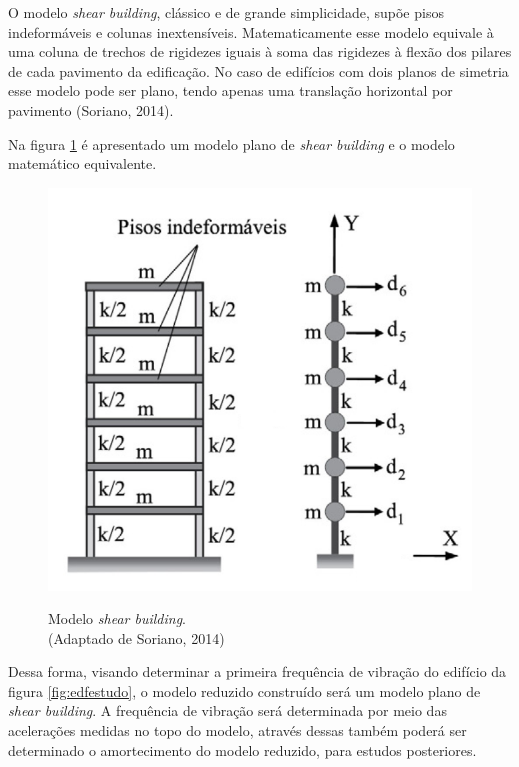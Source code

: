 O modelo \textit{shear building}, clássico e de grande simplicidade, supõe pisos indeformáveis e colunas inextensíveis. Matematicamente esse modelo equivale à uma coluna de trechos de rigidezes iguais à soma das rigidezes à flexão dos pilares de cada pavimento da edificação. No caso de edifícios com dois planos de simetria esse modelo pode ser plano, tendo apenas uma translação horizontal por pavimento (Soriano, 2014). 

Na figura \ref{fig:shearb} é apresentado um modelo plano de \textit{shear building} e o modelo matemático equivalente. 

\begin{figure}
	\centering
	\caption{Modelo \textit{shear building}.\\ \small{(Adaptado de Soriano, 2014)}}
	\includegraphics[scale=0.39]{../Images/ShearBuilding}
	\label{fig:shearb}
\end{figure}


Dessa forma, visando determinar a primeira frequência de vibração do edifício da figura \ref{fig:edfestudo}, o modelo reduzido construído será um modelo plano de \textit{shear building}. A frequência de vibração será determinada por meio das acelerações medidas no topo do modelo, através dessas também poderá ser determinado o amortecimento do modelo reduzido, para estudos posteriores. 






